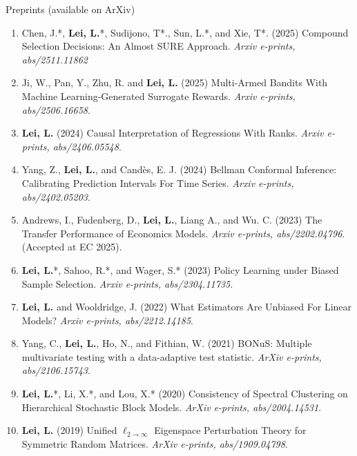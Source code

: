 \documentclass{article}
\begin{document}
\begin{large}
\noindent Preprints (available on ArXiv)
\end{large}

\begin{enumerate}
\item {\color{red}Chen, J.*, \textbf{Lei, L.}*, Sudijono, T*., Sun, L.*, and Xie, T*. (2025) Compound Selection Decisions: An Almost SURE Approach. \emph{Arxiv e-prints, abs/2511.11862}}
\item {\color{red}Ji, W., Pan, Y., Zhu, R. and \textbf{Lei, L.} (2025) Multi-Armed Bandits With Machine Learning-Generated Surrogate Rewards. \emph{Arxiv e-prints, abs/2506.16658}.}
\item \textbf{Lei, L.} (2024) Causal Interpretation of Regressions With Ranks. \emph{Arxiv e-prints, abs/2406.05548}.
\item Yang, Z., \textbf{Lei, L.}, and Cand\`{e}s, E. J. (2024) Bellman Conformal Inference: Calibrating Prediction Intervals For Time Series. \emph{Arxiv e-prints, abs/2402.05203}.
\item Andrews, I., Fudenberg, D., \textbf{Lei, L.}, Liang A., and Wu. C. (2023) The Transfer Performance of Economics Models. \emph{Arxiv e-prints, abs/2202.04796}. {\color{red}(Accepted at EC 2025)}.
\item \textbf{Lei, L.}*, Sahoo, R.*, and Wager, S.* (2023) Policy Learning under Biased Sample Selection. \emph{Arxiv e-prints, abs/2304.11735}.  
\item \textbf{Lei, L.} and Wooldridge, J. (2022) What Estimators Are Unbiased For Linear Models? \emph{Arxiv e-prints, abs/2212.14185}.
\item Yang, C., \textbf{Lei, L.}, Ho, N., and Fithian, W. (2021) BONuS: Multiple multivariate testing with a data-adaptive test statistic. \emph{ArXiv e-prints, abs/2106.15743}.
\item \textbf{Lei, L.}*, Li, X.*, and Lou, X.* (2020) Consistency of Spectral Clustering on Hierarchical Stochastic Block Models. \emph{ArXiv e-prints, abs/2004.14531}.
\item \textbf{Lei, L.} (2019) Unified $\ell_{2\rightarrow\infty}$ Eigenspace Perturbation Theory for Symmetric Random Matrices. \emph{ArXiv e-prints, abs/1909.04798}.
\end{enumerate}
\end{document}
